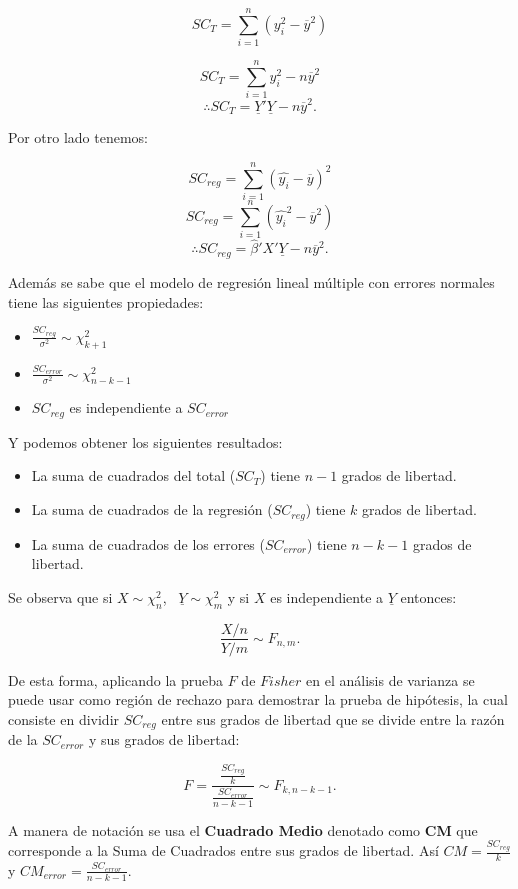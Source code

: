 \documentclass[a4paper,oneside,openany]{book}
\begin{document}
\[SC_{T}=\sum_{i=1}^{n}(y_{i}^2-\overline{y}^2)\]

\[SC_{T}=\sum_{i=1}^{n}y_{i}^2-n\overline{y}^2\]
\[\therefore SC_{T}=\underline{Y}'\underline{Y}-n\overline{y}^2.\]

Por otro lado tenemos:

\[SC_{reg}=\sum_{i=1}^{n}(\hat{y_{i}}-\overline{y})^2\]
\[SC_{reg}=\sum_{i=1}^{n}(\hat{y_{i}}^2-\overline{y}^2)\]
\[\therefore SC_{reg}=\hat{\beta}'X'\underline{Y}-n\overline{y}^2.\]

Además se sabe que el modelo de regresión lineal múltiple con errores
normales tiene las siguientes propiedades:

\begin{itemize}
\item
  \(\frac{SC_{reg}}{\sigma^2} \sim \chi^2_{k+1}\)
\item
  \(\frac{SC_{error}}{\sigma^2} \sim \chi^2_{n-k-1}\)
\item
  \(SC_{reg}\) es independiente a \(SC_{error}\)
\end{itemize}

Y podemos obtener los siguientes resultados:

\begin{itemize}
\item
  La suma de cuadrados del total (\(SC_{T}\)) tiene \(n-1\) grados de
  libertad.
\item
  La suma de cuadrados de la regresión (\(SC_{reg}\)) tiene \(k\) grados
  de libertad.
\item
  La suma de cuadrados de los errores (\(SC_{error}\)) tiene \(n-k-1\)
  grados de libertad.
\end{itemize}

Se observa que si \(X \sim \chi^2_{n}\),
~\(\underline{Y} \sim \chi^2_{m}\) y si \(X\) es independiente a
\(\underline{Y}\) entonces:

\[\frac{X/n}{Y/m} \sim F_{n,m}.\]

De esta forma, aplicando la prueba \(F\) de \(Fisher\) en el análisis de
varianza se puede usar como región de rechazo para demostrar la prueba
de hipótesis, la cual consiste en dividir \(SC_{reg}\) entre sus grados
de libertad que se divide entre la razón de la \(SC_{error}\) y sus
grados de libertad:

\[F=\frac{\frac{SC_{reg}}{k}}{\frac{SC_{error}}{n-k-1}} \sim F_{k,n-k-1}.\]

A manera de notación se usa el \textbf{Cuadrado Medio} denotado como
\textbf{CM} que corresponde a la Suma de Cuadrados entre sus grados de
libertad. Así \(CM=\frac{SC_{reg}}{k}\) y
\(CM_{error}=\frac{SC_{error}}{n-k-1}\).
\end{document}
